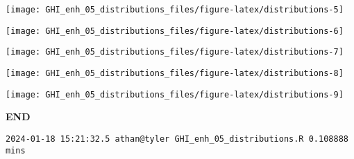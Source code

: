 \documentclass[
  10pt,
  a4paper,oneside]{article}
\begin{document}
\begin{center}\texttt{[image: GHI\_enh\_05\_distributions\_files/figure-latex/distributions-5]} \end{center}

\begin{center}\texttt{[image: GHI\_enh\_05\_distributions\_files/figure-latex/distributions-6]} \end{center}

\begin{center}\texttt{[image: GHI\_enh\_05\_distributions\_files/figure-latex/distributions-7]} \end{center}

\begin{center}\texttt{[image: GHI\_enh\_05\_distributions\_files/figure-latex/distributions-8]} \end{center}

\begin{center}\texttt{[image: GHI\_enh\_05\_distributions\_files/figure-latex/distributions-9]} \end{center}

\textbf{END}

\begin{verbatim}
2024-01-18 15:21:32.5 athan@tyler GHI_enh_05_distributions.R 0.108888 mins
\end{verbatim}
\end{document}
